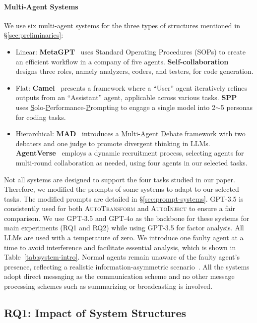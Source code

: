 \documentclass{article}
\theoremstyle{plain}
\theoremstyle{definition}
\theoremstyle{remark}
\begin{document}
\paragraph{Multi-Agent Systems}
We use six multi-agent systems for the three types of structures mentioned in \S\ref{sec:preliminaries}:
\begin{itemize}[leftmargin=*]
    \item Linear: \textbf{MetaGPT}~\cite{hong2023metagpt} uses Standard Operating Procedures (SOPs) to create an efficient workflow in a company of five agents. \textbf{Self-collaboration}~\cite{dong2023self} designs three roles, namely analyzers, coders, and testers, for code generation.
    \item Flat: \textbf{Camel}~\cite{li2024camel} presents a framework where a ``User'' agent iteratively refines outputs from an ``Assistant'' agent, applicable across various tasks. \textbf{SPP}~\cite{wang2023unleashing} uses \underline{S}olo-\underline{P}erformance-\underline{P}rompting to engage a single model into 2$\sim$5 personas for coding tasks.
    \item Hierarchical: \textbf{MAD}~\cite{liang2023encouraging} introduces a \underline{M}ulti-\underline{A}gent \underline{D}ebate framework with two debaters and one judge to promote divergent thinking in LLMs. \textbf{AgentVerse}~\cite{chen2023agentverse} employs a dynamic recruitment process, selecting agents for multi-round collaboration as needed, using four agents in our selected tasks.
\end{itemize}
Not all systems are designed to support the four tasks studied in our paper.
Therefore, we modified the prompts of some systems to adapt to our selected tasks.
The modified prompts are detailed in \S\ref{sec:prompt-systems}.
GPT-3.5 is consistently used for both \textsc{AutoTransform} and \textsc{AutoInject} to ensure a fair comparison.
We use GPT-3.5 and GPT-4o as the backbone for these systems for main experiments (RQ1 and RQ2) while using GPT-3.5 for factor analysis.
All LLMs are used with a temperature of zero.
We introduce one faulty agent at a time to avoid interference and facilitate essential analysis, which is shown in Table~\ref{tab:system-intro}.
Normal agents remain unaware of the faulty agent's presence, reflecting a realistic information-asymmetric scenario~\cite{zhou2024real}.
All the systems adopt direct messaging as the communication scheme and no other message processing schemes such as summarizing or broadcasting is involved.

\subsection{RQ1: Impact of System Structures}
\label{sec:rq1}
\end{document}
